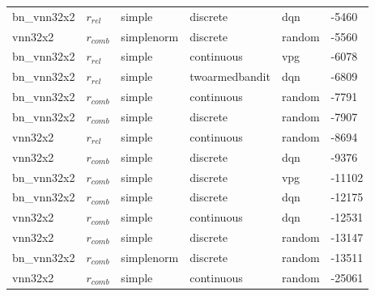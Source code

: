 \begin{table}[]
{\begin{tabular}{l|l|l|l|l|l}
            bn\_vnn32x2      &       $r_{rel}$        &       simple                 &   discrete           & dqn                  & -5460      \\
            vnn32x2          &       $r_{comb}$       &       simplenorm             &   discrete           & random               & -5560      \\
            bn\_vnn32x2      &       $r_{rel}$        &       simple                 &   continuous         & vpg                  & -6078      \\
            bn\_vnn32x2      &       $r_{rel}$        &       simple                 &   twoarmedbandit     & dqn                  & -6809      \\
            bn\_vnn32x2      &       $r_{comb}$       &       simple                 &   continuous         & random               & -7791      \\
            bn\_vnn32x2      &       $r_{comb}$       &       simple                 &   discrete           & random               & -7907      \\
            vnn32x2          &       $r_{rel}$        &       simple                 &   continuous         & random               & -8694      \\
            vnn32x2          &       $r_{comb}$       &       simple                 &   discrete           & dqn                  & -9376      \\
            bn\_vnn32x2      &       $r_{comb}$       &       simple                 &   discrete           & vpg                  & -11102     \\
            bn\_vnn32x2      &       $r_{comb}$       &       simple                 &   discrete           & dqn                  & -12175     \\
            vnn32x2          &       $r_{comb}$       &       simple                 &   continuous         & dqn                  & -12531     \\
            vnn32x2          &       $r_{comb}$       &       simple                 &   discrete           & random               & -13147     \\
            bn\_vnn32x2      &       $r_{comb}$       &       simplenorm             &   discrete           & random               & -13511     \\
            vnn32x2          &       $r_{comb}$       &       simple                 &   continuous         & random               & -25061     \\

\end{tabular}}
\end{table}
